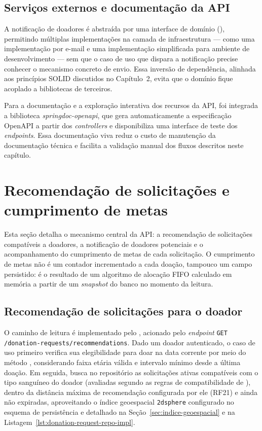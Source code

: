\subsection{Serviços externos e documentação da API}

A notificação de doadores é abstraída por uma interface de domínio (), permitindo múltiplas implementações na camada de infraestrutura --- como uma implementação por e-mail e uma implementação simplificada para ambiente de desenvolvimento --- sem que o caso de uso que dispara a notificação precise conhecer o mecanismo concreto de envio. Essa inversão de dependência, alinhada aos princípios SOLID discutidos no Capítulo~2, evita que o domínio fique acoplado a bibliotecas de terceiros. 

Para a documentação e a exploração interativa dos recursos da API, foi integrada a biblioteca \textit{springdoc-openapi}, que gera automaticamente a especificação OpenAPI a partir dos \textit{controllers} e disponibiliza uma interface de teste dos \textit{endpoints}. Essa documentação viva reduz o custo de manutenção da documentação técnica e facilita a validação manual dos fluxos descritos neste capítulo.

\section{Recomendação de solicitações e cumprimento de metas}
\label{sec:recomendacao-fulfillment}

Esta seção detalha o mecanismo central da API: a recomendação de solicitações compatíveis a doadores, a notificação de doadores potenciais e o acompanhamento do cumprimento de metas de cada solicitação. O cumprimento de metas não é um contador incrementado a cada doação, tampouco um campo persistido: é o resultado de um algoritmo de alocação FIFO calculado em memória a partir de um \textit{snapshot} do banco no momento da leitura.

\subsection{Recomendação de solicitações para o doador}

O caminho de leitura é implementado pelo , acionado pelo \textit{endpoint} \texttt{GET /donation-requests/recommendations}. Dado um doador autenticado, o caso de uso primeiro verifica sua elegibilidade para doar na data corrente por meio do método , considerando faixa etária válida e intervalo mínimo desde a última doação. Em seguida, busca no repositório as solicitações ativas compatíveis com o tipo sanguíneo do doador (avaliadas segundo as regras de compatibilidade de ), dentro da distância máxima de recomendação configurada por ele (RF21) e ainda não expiradas, aproveitando o índice geoespacial \texttt{2dsphere} configurado no esquema de persistência e detalhado na Seção~\ref{sec:indice-geoespacial} e na Listagem~\ref{lst:donation-request-repo-impl}.

